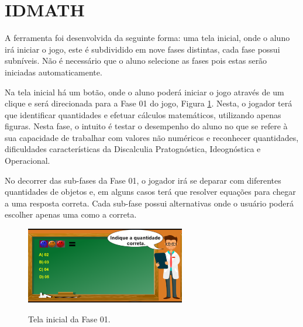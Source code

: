 \documentclass[
	12pt,				%
    oneside,			%
	a4paper,			%
	english,			%
	french,				%
	spanish,			%
	brazil,				%
	]{abntex2}
\begin{document}
\section{IDMATH}


A ferramenta foi desenvolvida da seguinte forma: uma tela inicial, onde o aluno irá iniciar o jogo,  este é subdividido em nove fases distintas, cada fase possui subníveis. Não é necessário que o aluno selecione as fases pois estas serão  iniciadas automaticamente.

Na tela inicial há um botão, onde o aluno poderá iniciar o jogo através de um clique e será direcionada para a Fase 01 do jogo, Figura \ref{jogo01}. Nesta, o jogador terá que identificar quantidades e efetuar cálculos matemáticos, utilizando apenas figuras. Nesta fase, o intuito é testar o desempenho do aluno no que se refere à sua capacidade de trabalhar com valores não numéricos e reconhecer quantidades, dificuldades características da Discalculia Pratognóstica, Ideognóstica e Operacional.

No decorrer das sub-fases da Fase 01, o jogador irá se deparar com diferentes quantidades de objetos e, em alguns casos terá que resolver equações para chegar a uma resposta correta. Cada sub-fase possui alternativas onde o usuário poderá escolher apenas uma como a correta.

\begin{figure} [h] 


\caption{Tela inicial  da Fase 01.}

\includegraphics[width=0.62\textwidth]{jogo01.png} %
\centering
\\
\label{jogo01} 
\end{figure}
\end{document}
